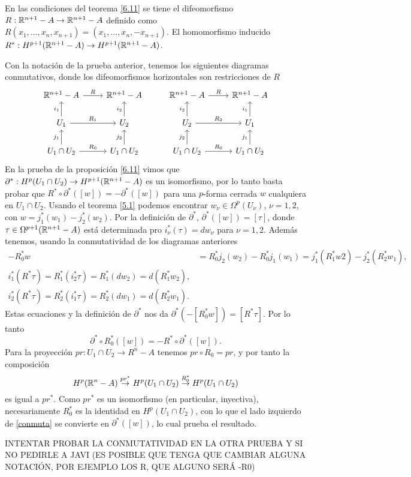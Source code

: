 \documentclass[CV.tex]{subfiles}
\begin{document}
\begin{prop}
En las condiciones del teorema \ref{6.11} se tiene el difeomorfismo $R:\mathbb{R}^{n+1}-A\to \mathbb{R}^{n+1}-A$ definido como $R(x_1,\dots, x_n,x_{n+1})=(x_1,\dots, x_n,-x_{n+1})$. El homomorfismo inducido $R^*:H^{p+1}(\mathbb{R}^{n+1}-A)\to H^{p+1}(\mathbb{R}^{n+1}-A)$. 
\end{prop}
\begin{dem}
Con la notación de la prueba anterior, tenemos los siguientes diagramas conmutativos, donde los difeomorfismos horizontales son restricciones de $R$
\[
\begin{tikzcd}
\R^{n+1}-A \arrow[r, "R"] & \R^{n+1}-A  &                               \R^{n+1}-A \arrow[r, "R"] & \R^{n+1}-A\\
U_1\arrow[u, "i_1"]\arrow[r, "R_1"] & U_2\arrow[u, "i_2"] &              U_2\arrow[u, "i_2"]\arrow[r, "R_2"] & U_1\arrow[u, "i_1"]\\
U_1\cap U_2\arrow[u, "j_1"]\arrow[r,"R_0"] & U_1\cap U_2\arrow[u, "j_2"]&U_1\cap U_2\arrow[u, "j_2"]\arrow[r,"R_0"] & U_1\cap U_2\arrow[u, "j_1"]
\end{tikzcd}
\]
En  la prueba de la proposición \ref{6.11} vimos que $\partial^*:H^p(U_1\cap U_2)\to H^{p+1}(\mathbb{R}^{n+1}-A)$ es un isomorfismo, por lo tanto basta probar que $R^*\circ\partial^*([w])=-\partial^*([w])$ para una $p$-forma cerrada $w$ cualquiera en $U_1\cap U_2$. Usando el teorema \ref{5.1} podemos encontrar $w_{\nu}\in \Omega^p(U_{\nu})$, $\nu=1,2$, con $w=j_1^*(w_1)-j_2^*(w_2)$. Por la definición de $\partial^*$, $\partial^*([w])=[\tau]$, donde $\tau\in \Omega^{p+1}(\mathbb{R}^{n+1}-A)$ está determinada pro $i_{\nu}^*(\tau)=dw_{\nu}$ para $\nu=1,2$. Además tenemos, usando la conmutatividad de los diagramas anteriores
\begin{align*}
-R_0^*w&=R_0^*j_2(w_2)-R_0^*j_1(w_1)=j_1^*(R_1^*w2)-j_2^*(R_2^*w_1),\\
i_1^*(R^*\tau)=R_1^*(i_2^*\tau)=R_1^*(dw_2)=d(R_1^*w_2),\\
i_2^*(R^*\tau)=R_2^*(i_1^*\tau)=R_2^*(dw_1)=d(R_2^*w_1).
\end{align*}
Estas ecuaciones y la definición de $\partial^*$ nos da $\partial^*(-[R_0^*w])=[R^*\tau]$. Por lo tanto
\begin{equation}\label{conmuta}
\partial^*\circ R^*_0([w])=-R^*\circ\partial^*([w]).
\end{equation}
Para la proyección $pr:U_1\cap U_2\to R^n-A$ tenemos $pr\circ R_0=pr$, y por tanto la composición
\[
H^p(\mathbb{R}^n-A)\overset{pr^*}{\to} H^p(U_1\cap U_2)\overset{R_0^*}{\to}H^p(U_1\cap U_2)
\]
es igual a $pr^*$. Como $pr^*$ es un isomorfismo (en particular, inyectiva), necesariamente $R_0^*$ es la identidad en $H^p(U_1\cap U_2)$, con lo que el lado izquierdo de \ref{conmuta} se convierte en $\partial^*([w])$, lo cual prueba el resultado.
\QED
\end{dem}
INTENTAR PROBAR LA CONMUTATIVIDAD EN LA OTRA PRUEBA Y SI NO PEDIRLE A JAVI (ES POSIBLE QUE TENGA QUE CAMBIAR ALGUNA NOTACIÓN, POR EJEMPLO LOS R, QUE ALGUNO SERÁ -R0)
\end{document}
